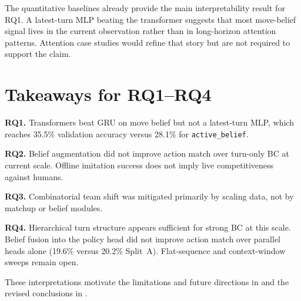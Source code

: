 The quantitative baselines already provide the main interpretability result for
RQ1. A latest-turn MLP beating the transformer suggests that most move-belief
signal lives in the current observation rather than in long-horizon attention
patterns. Attention case studies would refine that story but are not required to
support the claim.

\section{Takeaways for RQ1--RQ4}

\textbf{RQ1.} Transformers beat GRU on move belief but not a latest-turn MLP,
which reaches 35.5\% validation accuracy versus 28.1\% for
\texttt{active\_belief}.

\textbf{RQ2.} Belief augmentation did not improve action match over turn-only BC
at current scale. Offline imitation success does not imply live competitiveness
against humans.

\textbf{RQ3.} Combinatorial team shift was mitigated primarily by scaling data,
not by matchup or belief modules.

\textbf{RQ4.} Hierarchical turn structure appears sufficient for strong BC at this
scale. Belief fusion into the policy head did not improve action match over
parallel heads alone (19.6\% versus 20.2\% Split~A). Flat-sequence and
context-window sweeps remain open.

These interpretations motivate the limitations and future directions in
 and the revised conclusions in .
